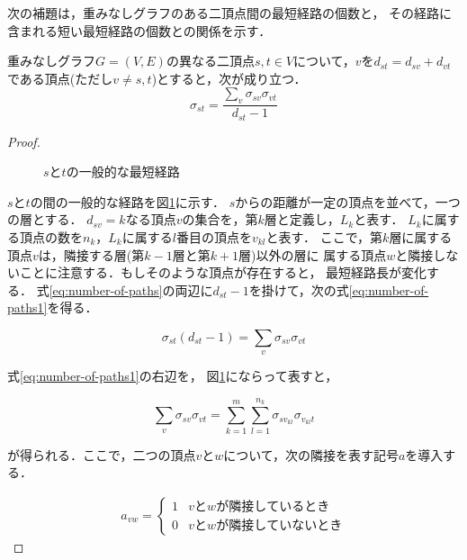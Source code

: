 次の補題は，重みなしグラフのある二頂点間の最短経路の個数と，
その経路に含まれる短い最短経路の個数との関係を示す．
\begin{lemma}
  \label{lemma:number-of-paths}
  重みなしグラフ$G=(V,E)$の異なる二頂点$s,t\in V$について，$v$を$d_{st}=d_{sv}+d_{vt}$
  である頂点(ただし$v\neq s,t$)とすると，次が成り立つ．
  \begin{equation}
    \label{eq:number-of-paths}
    \sigma_{st}=\frac{\sum_{v}\sigma_{sv}\sigma_{vt}}{d_{st}-1}
  \end{equation}
\end{lemma}
\begin{proof}
  \begin{figure}
    \centering
    \def\svgwidth{.5\columnwidth}
    
    \caption{$s$と$t$の一般的な最短経路}
    \label{fig:general-shortest-paths}
  \end{figure}
  $s$と$t$の間の一般的な経路を図\ref{fig:general-shortest-paths}に示す．
  $s$からの距離が一定の頂点を並べて，一つの層とする．
  $d_{sv}=k$なる頂点$v$の集合を，第$k$層と定義し，$L_k$と表す．
  $L_k$に属する頂点の数を$n_k$，$L_k$に属する$l$番目の頂点を$v_{kl}$と表す．
  ここで，第$k$層に属する頂点$v$は，隣接する層(第$k-1$層と第$k+1$層)以外の層に
  属する頂点$w$と隣接しないことに注意する．もしそのような頂点が存在すると，
  最短経路長が変化する．
  式\eqref{eq:number-of-paths}の両辺に$d_{st}-1$を掛けて，次の式\eqref{eq:number-of-paths1}を得る．

  \begin{equation}
    \sigma_{st}(d_{st}-1)=\sum_{v}\sigma_{sv}\sigma_{vt}
    \label{eq:number-of-paths1}
  \end{equation}

  式\eqref{eq:number-of-paths1}の右辺を，
  図\ref{fig:general-shortest-paths}にならって表すと，

  \begin{equation}
    \sum_{v}\sigma_{sv}\sigma_{vt}=
    \sum_{k=1}^m\sum_{l=1}^{n_k}\sigma_{sv_{kl}}\sigma_{v_{kl}t}
    \label{eq:number-of-paths2}
  \end{equation}

  が得られる．ここで，二つの頂点$v$と$w$について，次の隣接を表す記号$a$を導入する．

  \begin{align*}
    a_{vw}=
    \begin{cases}
      1 & vとwが隣接しているとき \\
      0 & vとwが隣接していないとき
    \end{cases}
  \end{align*}


\end{proof}
